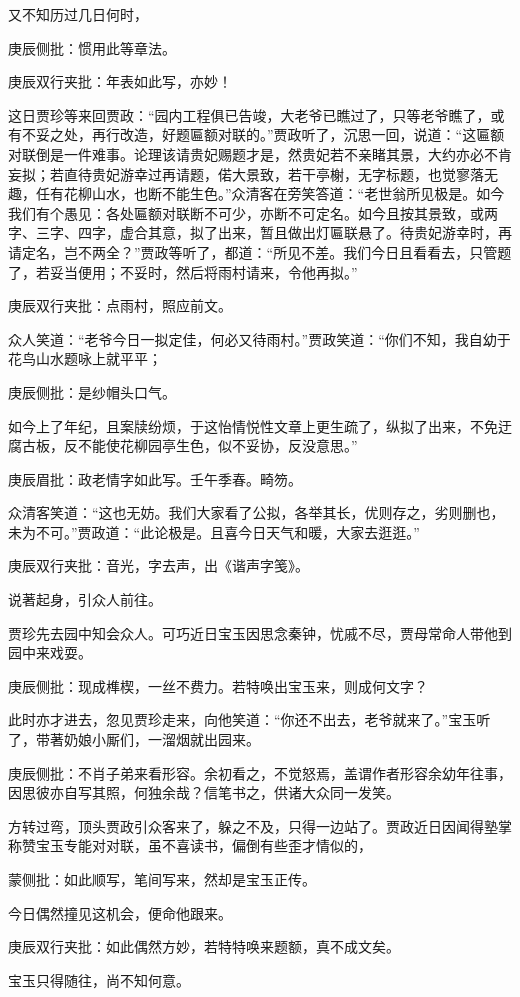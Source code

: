 \begin{parag}
    又不知历过几日何时，\begin{note}庚辰侧批：惯用此等章法。\end{note}\begin{note}庚辰双行夹批：年表如此写，亦妙！\end{note}这日贾珍等来回贾政：“园内工程俱已告竣，大老爷已瞧过了，只等老爷瞧了，或有不妥之处，再行改造，好题匾额对联的。”贾政听了，沉思一回，说道：“这匾额对联倒是一件难事。论理该请贵妃赐题才是，然贵妃若不亲睹其景，大约亦必不肯妄拟；若直待贵妃游幸过再请题，偌大景致，若干亭榭，无字标题，也觉寥落无趣，任有花柳山水，也断不能生色。”众清客在旁笑答道：“老世翁所见极是。如今我们有个愚见：各处匾额对联断不可少，亦断不可定名。如今且按其景致，或两字、三字、四字，虚合其意，拟了出来，暂且做出灯匾联悬了。待贵妃游幸时，再请定名，岂不两全？”贾政等听了，都道：“所见不差。我们今日且看看去，只管题了，若妥当便用；不妥时，然后将雨村请来，令他再拟。”\begin{note}庚辰双行夹批：点雨村，照应前文。\end{note}众人笑道：“老爷今日一拟定佳，何必又待雨村。”贾政笑道：“你们不知，我自幼于花鸟山水题咏上就平平；\begin{note}庚辰侧批：是纱帽头口气。\end{note}如今上了年纪，且案牍纷烦，于这怡情悦性文章上更生疏了，纵拟了出来，不免迂腐古板，反不能使花柳园亭生色，似不妥协，反没意思。”\begin{note}庚辰眉批：政老情字如此写。壬午季春。畸笏。\end{note}众清客笑道：“这也无妨。我们大家看了公拟，各举其长，优则存之，劣则删也，未为不可。”贾政道：“此论极是。且喜今日天气和暖，大家去逛逛。”\begin{note}庚辰双行夹批：音光，字去声，出《谐声字笺》。\end{note}说著起身，引众人前往。
\end{parag}


\begin{parag}
    贾珍先去园中知会众人。可巧近日宝玉因思念秦钟，忧戚不尽，贾母常命人带他到园中来戏耍。\begin{note}庚辰侧批：现成榫楔，一丝不费力。若特唤出宝玉来，则成何文字？\end{note}此时亦才进去，忽见贾珍走来，向他笑道：“你还不出去，老爷就来了。”宝玉听了，带著奶娘小厮们，一溜烟就出园来。\begin{note}庚辰侧批：不肖子弟来看形容。余初看之，不觉怒焉，盖谓作者形容余幼年往事，因思彼亦自写其照，何独余哉？信笔书之，供诸大众同一发笑。\end{note}方转过弯，顶头贾政引众客来了，躲之不及，只得一边站了。贾政近日因闻得塾掌称赞宝玉专能对对联，虽不喜读书，偏倒有些歪才情似的，\begin{note}蒙侧批：如此顺写，笔间写来，然却是宝玉正传。\end{note}今日偶然撞见这机会，便命他跟来。\begin{note}庚辰双行夹批：如此偶然方妙，若特特唤来题额，真不成文矣。\end{note}宝玉只得随往，尚不知何意。
\end{parag}


